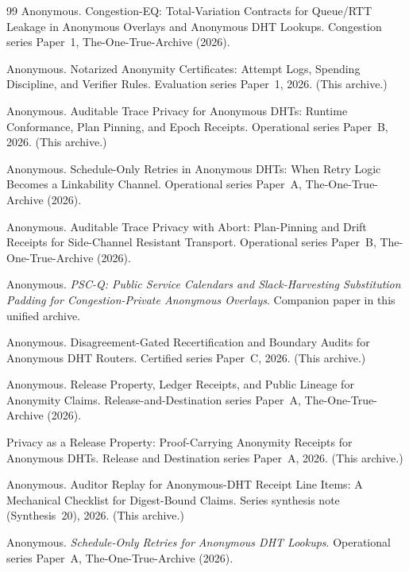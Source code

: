 \documentclass[11pt]{article}
\begin{document}
\begin{thebibliography}{99}
Anonymous.
\newblock Congestion-EQ: Total-Variation Contracts for Queue/RTT Leakage in Anonymous Overlays and Anonymous DHT Lookups.
\newblock Congestion series Paper~1, The-One-True-Archive (2026).

Anonymous.
\newblock Notarized Anonymity Certificates: Attempt Logs, Spending Discipline, and Verifier Rules.
\newblock Evaluation series Paper~1, 2026. (This archive.)

Anonymous.
\newblock Auditable Trace Privacy for Anonymous DHTs: Runtime Conformance, Plan Pinning, and Epoch Receipts.
\newblock Operational series Paper~B, 2026. (This archive.)

Anonymous.
\newblock Schedule-Only Retries in Anonymous DHTs: When Retry Logic Becomes a Linkability Channel.
\newblock Operational series Paper~A, The-One-True-Archive (2026).

Anonymous.
\newblock Auditable Trace Privacy with Abort: Plan-Pinning and Drift Receipts for Side-Channel Resistant Transport.
\newblock Operational series Paper~B, The-One-True-Archive (2026).

Anonymous.
\newblock \emph{PSC-Q: Public Service Calendars and Slack-Harvesting Substitution Padding for Congestion-Private Anonymous Overlays}.
\newblock Companion paper in this unified archive.

Anonymous.
\newblock Disagreement-Gated Recertification and Boundary Audits for Anonymous DHT Routers.
\newblock Certified series Paper~C, 2026. (This archive.)

Anonymous.
\newblock Release Property, Ledger Receipts, and Public Lineage for Anonymity Claims.
\newblock Release-and-Destination series Paper~A, The-One-True-Archive (2026).

Privacy as a Release Property: Proof-Carrying Anonymity Receipts for Anonymous DHTs.
\newblock Release and Destination series Paper~A, 2026. (This archive.)

Anonymous.
\newblock Auditor Replay for Anonymous-DHT Receipt Line Items: A Mechanical Checklist for Digest-Bound Claims.
\newblock Series synthesis note (Synthesis~20), 2026. (This archive.)

Anonymous.
\newblock \emph{Schedule-Only Retries for Anonymous DHT Lookups}.
\newblock Operational series Paper~A, The-One-True-Archive (2026).


\end{thebibliography}
\end{document}
